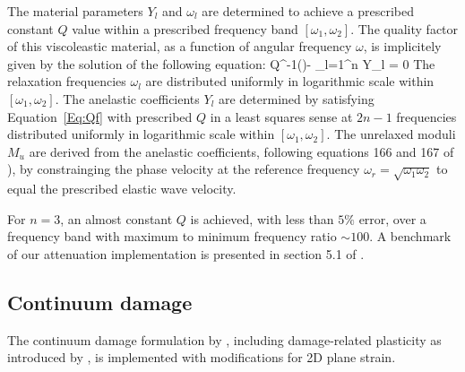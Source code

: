 The material parameters $Y_l$ and $\omega_l$ are determined to achieve
a prescribed constant $Q$ value within a prescribed frequency band $[\omega_1,\omega_2]$.
The quality factor of this viscoleastic material, as a function of angular frequency $\omega$, is
implicitely given by the solution of the following equation:
\eq
Q^{-1}(\omega)- \sum_{l=1}^n  Y_l = 0
\en
The relaxation frequencies $\omega_l$ are distributed uniformly in logarithmic scale
within $[\omega_1,\omega_2]$.
The anelastic coefficients $Y_l$ are determined by satisfying Equation~\ref{Eq:Qf} with prescribed $Q$ 
in a least squares sense at $2n-1$ frequencies 
distributed uniformly in logarithmic scale within $[\omega_1,\omega_2]$.
The unrelaxed moduli $M_u$ are derived from the anelastic coefficients, 
following equations 166 and 167 of ),
by constrainging the phase velocity at the reference frequency $\omega_r=\sqrt{\omega_1 \omega_2}$
to equal the prescribed elastic wave velocity.

For $n=3$, an almost constant $Q$ is achieved, with less than $5\%$ error, 
over a frequency band with maximum to minimum frequency ratio $\sim 100$. 
A benchmark of our attenuation implementation is presented in section 5.1 of .

\subsection{Continuum damage}

The continuum damage formulation by , 
including damage-related plasticity as introduced by ,
is implemented with modifications for 2D plane strain.


